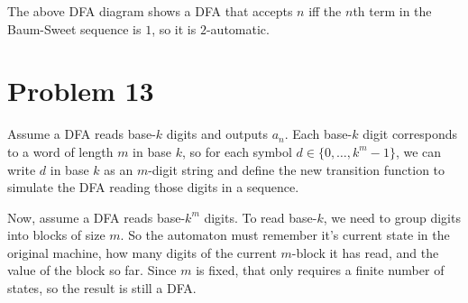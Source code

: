 \documentclass{article}
\begin{document}
The above DFA diagram shows a DFA that accepts $n$ iff the $n$th term in the Baum-Sweet sequence is $1$, so it is $2$-automatic.

\section*{Problem 13}
Assume a DFA reads base-$k$ digits and outputs $a_n$. Each base-$k$ digit corresponds to a word of length $m$ in base $k$, so for each symbol $d \in \{0, \ldots, k^m - 1\}$, we can write $d$ in base $k$ as an $m$-digit string and define the new transition function to simulate the DFA reading those digits in a sequence.

Now, assume a DFA reads base-$k^m$ digits. To read base-$k$, we need to group digits into blocks of size $m$. So the automaton must remember it's current state in the original machine, how many digits of the current $m$-block it has read, and the value of the block so far. Since $m$ is fixed, that only requires a finite number of states, so the result is still a DFA.
\end{document}
